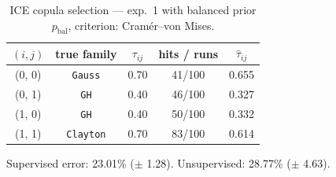 \begin{table}[htbp]
  \centering
  \caption{ICE copula selection — exp.\ 1 with balanced prior $p_{\text{bal}}$, criterion: Cram\'er--von Mises.}
  \label{tab:exp3-exp1_bal_p__cvm}
  \begin{tabular}{ccccc}
    \toprule
    $(i, j)$ & true family & $\tau_{ij}$ & hits / runs & $\hat\tau_{ij}$ \\
    \midrule
    (0, 0) & \texttt{Gauss} & 0.70 & 41/100 & 0.655 \\
    (0, 1) & \texttt{GH} & 0.40 & 46/100 & 0.327 \\
    (1, 0) & \texttt{GH} & 0.40 & 50/100 & 0.332 \\
    (1, 1) & \texttt{Clayton} & 0.70 & 83/100 & 0.614 \\
    \bottomrule
  \end{tabular}
  \par\smallskip Supervised error: 23.01\% ($\pm$ 1.28). Unsupervised: 28.77\% ($\pm$ 4.63).
\end{table}

